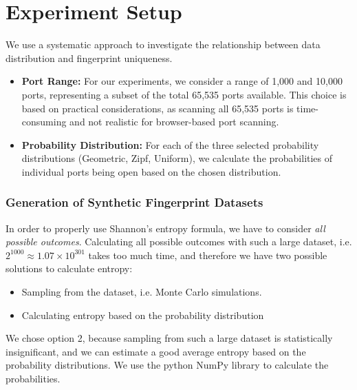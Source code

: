 \section{Experiment Setup}

We use a systematic approach to investigate the relationship between data distribution and fingerprint uniqueness. 

\begin{itemize}
\item \textbf{Port Range:} For our experiments, we consider a range of 1,000 and 10,000 ports, representing a subset of the total 65,535 ports available. This choice is based on practical considerations, as scanning all 65,535 ports is time-consuming and not realistic for browser-based port scanning.

\item \textbf{Probability Distribution:} For each of the three selected probability distributions (Geometric, Zipf, Uniform), we calculate the probabilities of individual ports being open based on the chosen distribution. 
\end{itemize}

\subsubsection{Generation of Synthetic Fingerprint Datasets}

In order to properly use Shannon's entropy formula, we have to consider \emph{all possible outcomes}. Calculating all possible outcomes with such a large dataset, i.e. $2^{1000} \approx 1.07 \times 10^{301}$ takes too much time, and therefore we have two possible solutions to calculate entropy:

\begin{itemize}
    \item Sampling from the dataset, i.e. Monte Carlo simulations.
    \item Calculating entropy based on the probability distribution
\end{itemize}

We chose option 2, because sampling from such a large dataset is statistically insignificant, and we can estimate a good average entropy based on the probability distributions.
We use the python NumPy library to calculate the probabilities.



